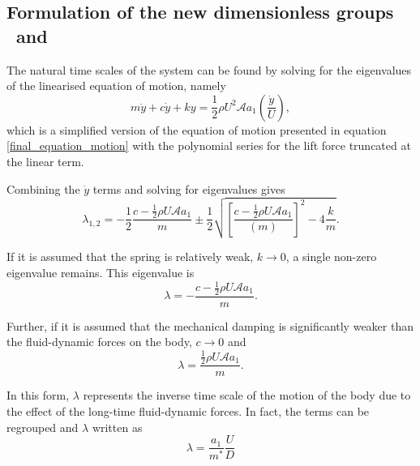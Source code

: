  \subsection{Formulation of the new dimensionless groups \massstiff \ and \massdamp}
\label{sec:newvar}
  The natural time scales of the system can be found by solving for the eigenvalues of the linearised equation of motion, namely
 \begin{equation}
 \label{eqn:eom_linear}
 m\ddot{y}{+}c\dot{y}{+}ky{=}\frac{1}{2}\rho U^2 \mathcal{A} a_1\left(\frac{\dot{y}}{U}\right),
 \end{equation}
 which is a simplified version of the equation of motion presented in equation \ref{final_equation_motion} with the polynomial series for the lift force truncated at the linear term.
 
Combining the $\dot{y}$ terms and solving for eigenvalues gives
 \begin{equation}
   \label{eqn:eigs}
   \lambda_{1,2}= -\frac{1}{2}\frac{c-\frac{1}{2}\rho U\mathcal{A}a_1}{m}\pm\frac{1}{2}\sqrt{\left[\frac{c-\frac{1}{2}\rho U\mathcal{A}a_1}{(m)}\right]^2-4\frac{k}{m}}.
 \end{equation}
 
If it is assumed that the spring is relatively weak, $k\rightarrow 0$, a single non-zero eigenvalue remains. This eigenvalue is
 \begin{equation}
   \label{eqn:eigs_nospring}
   \lambda=-\frac{c-\frac{1}{2}\rho U\mathcal{A}a_1}{m}.
 \end{equation}
 
Further, if it is assumed that the mechanical damping is significantly weaker than the fluid-dynamic forces on the body, $c\rightarrow 0$ and
 \begin{equation}
   \label{eqn:eigs_nospring_nodamp}
   \lambda=\frac{\frac{1}{2}\rho U\mathcal{A}a_1}{m}.
 \end{equation}
 

 In this form, $\lambda$ represents the inverse time scale of the motion of the body due to the effect of the long-time fluid-dynamic forces. In fact, the terms can be regrouped and $\lambda$ written as
 \begin{equation}
   \label{eqn:timescale}
   \lambda = \frac{a_1}{m^*}\frac{U}{D}
 \end{equation}
 
